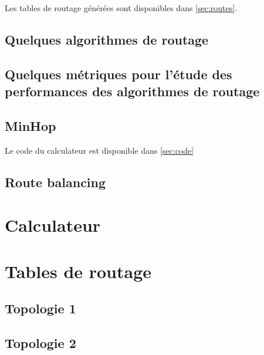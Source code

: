 \documentclass{report}
\begin{document}
			Les tables de routage générées sont disponibles dans \autoref{sec:routes}.
						
		\section{Quelques algorithmes de routage}
		
		\section{Quelques métriques pour l’étude des performances des algorithmes de routage}
			\section{MinHop}
				Le code du calculateur est disponible dans \autoref{sec:code}
				
			\section{Route balancing}
				
			
		
	\appendix
	\chapter{Calculateur\label{sec:code}}
		
	
	\chapter{Tables de routage\label{sec:routes}}
		\section{Topologie 1}
			
			
		\section{Topologie 2}
			
	
\end{document}
